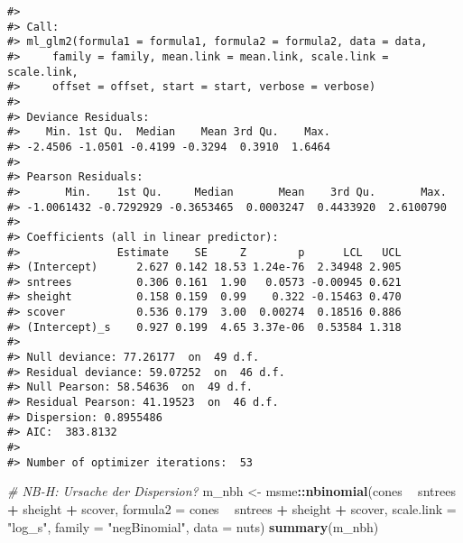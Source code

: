 \documentclass[ngerman,a4paper,]{scrartcl}
\newenvironment{Shaded}{\begin{snugshade}}{\end{snugshade}}
\newcommand{\CommentTok}[1]{\textcolor[rgb]{0.56,0.35,0.01}{\textit{#1}}}
\newcommand{\DataTypeTok}[1]{\textcolor[rgb]{0.13,0.29,0.53}{#1}}
\newcommand{\KeywordTok}[1]{\textcolor[rgb]{0.13,0.29,0.53}{\textbf{#1}}}
\newcommand{\NormalTok}[1]{#1}
\newcommand{\OperatorTok}[1]{\textcolor[rgb]{0.81,0.36,0.00}{\textbf{#1}}}
\newcommand{\StringTok}[1]{\textcolor[rgb]{0.31,0.60,0.02}{#1}}
\theoremstyle{definition}
\theoremstyle{definition}
\theoremstyle{definition}
\theoremstyle{remark}
\begin{document}
\begin{verbatim}
#> 
#> Call:
#> ml_glm2(formula1 = formula1, formula2 = formula2, data = data, 
#>     family = family, mean.link = mean.link, scale.link = scale.link, 
#>     offset = offset, start = start, verbose = verbose)
#> 
#> Deviance Residuals:
#>    Min. 1st Qu.  Median    Mean 3rd Qu.    Max. 
#> -2.4506 -1.0501 -0.4199 -0.3294  0.3910  1.6464 
#> 
#> Pearson Residuals:
#>       Min.    1st Qu.     Median       Mean    3rd Qu.       Max. 
#> -1.0061432 -0.7292929 -0.3653465  0.0003247  0.4433920  2.6100790 
#> 
#> Coefficients (all in linear predictor):
#>               Estimate    SE     Z        p      LCL   UCL
#> (Intercept)      2.627 0.142 18.53 1.24e-76  2.34948 2.905
#> sntrees          0.306 0.161  1.90   0.0573 -0.00945 0.621
#> sheight          0.158 0.159  0.99    0.322 -0.15463 0.470
#> scover           0.536 0.179  3.00  0.00274  0.18516 0.886
#> (Intercept)_s    0.927 0.199  4.65 3.37e-06  0.53584 1.318
#> 
#> Null deviance: 77.26177  on  49 d.f.
#> Residual deviance: 59.07252  on  46 d.f.
#> Null Pearson: 58.54636  on  49 d.f.
#> Residual Pearson: 41.19523  on  46 d.f.
#> Dispersion: 0.8955486
#> AIC:  383.8132
#> 
#> Number of optimizer iterations:  53
\end{verbatim}

\begin{Shaded}
\begin{Highlighting}[]
\CommentTok{# NB-H: Ursache der Dispersion?}
\NormalTok{m_nbh <-}\StringTok{ }\NormalTok{msme}\OperatorTok{::}\KeywordTok{nbinomial}\NormalTok{(cones }\OperatorTok{~}\StringTok{ }\NormalTok{sntrees }\OperatorTok{+}\StringTok{ }\NormalTok{sheight }\OperatorTok{+}\StringTok{ }\NormalTok{scover, }
                         \DataTypeTok{formula2 =}\NormalTok{ cones }\OperatorTok{~}\StringTok{ }\NormalTok{sntrees }\OperatorTok{+}\StringTok{ }\NormalTok{sheight }\OperatorTok{+}\StringTok{ }\NormalTok{scover,}
                         \DataTypeTok{scale.link =} \StringTok{"log_s"}\NormalTok{,}
                         \DataTypeTok{family =} \StringTok{"negBinomial"}\NormalTok{,}
                         \DataTypeTok{data =}\NormalTok{ nuts)}
\KeywordTok{summary}\NormalTok{(m_nbh)}
\end{Highlighting}
\end{Shaded}
\end{document}
